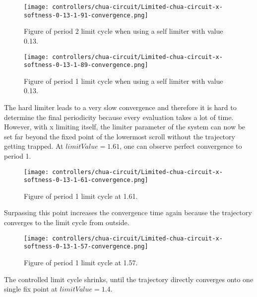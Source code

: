\documentclass[main]{subfiles}
\begin{document}
\begin{figure}[H]
\centering
\texttt{[image: controllers/chua-circuit/Limited-chua-circuit-x-softness-0-13-1-91-convergence.png]}
\caption[Figure of period 2 limit cycle using self limiter 0.13 soft limiter]{Figure of period 2 limit cycle when using a self limiter with value 0.13.}
\label{figure:x-0.13-2-limit-cycle-trajectory}
\end{figure}

\begin{figure}[H]
\centering
\texttt{[image: controllers/chua-circuit/Limited-chua-circuit-x-softness-0-13-1-89-convergence.png]}
\caption[Figure of period 1 limit cycle using self limiter 0.13 soft limiter]{Figure of period 1 limit cycle when using a self limiter with value 0.13.}
\label{figure:x-0.13-1-limit-cycle-trajectory}
\end{figure}

The hard limiter leads to a very slow convergence and therefore it is hard to determine the final periodicity because every evaluation takes a lot of time. %
%
However, with x limiting itself, the limiter parameter of the system can now be set far beyond the fixed point of the lowermost scroll without the trajectory getting trapped. %
%
At \(limitValue=1.61\), one can observe perfect convergence to period 1.

\begin{figure}[H]
\centering
\texttt{[image: controllers/chua-circuit/Limited-chua-circuit-x-softness-0-13-1-61-convergence.png]}
\caption[Figure of period 1 limit cycle]{Figure of period 1 limit cycle at 1.61.}
\label{figure:x-0.13-fast-1-limit-cycle-trajectory-1-61}
\end{figure}

Surpassing this point increases the convergence time again because the trajectory converges to the limit cycle from outside.

\begin{figure}[H]
\centering
\texttt{[image: controllers/chua-circuit/Limited-chua-circuit-x-softness-0-13-1-57-convergence.png]}
\caption[Figure of period another 1 limit cycle]{Figure of period 1 limit cycle at 1.57.}
\label{figure:x-0.13-fast-1-limit-cycle-trajectory-1-57}
\end{figure}

The controlled limit cycle shrinks, until the trajectory directly converges onto one single fix point at \(limitValue=1.4\). 
\end{document}
